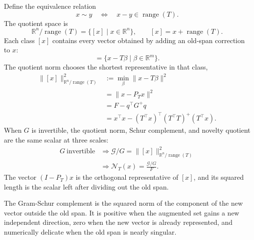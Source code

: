 \documentclass[10pt,twocolumn]{article}
\newcommand{\R}{\mathbb R}
\newcommand{\range}{\operatorname{range}}
\newcommand{\nov}{\mathcal N}
\begin{document}
Define the equivalence relation
\begin{equation}
x\sim y
\quad\Longleftrightarrow\quad
x-y\in\range(T).
\label{eq:quotient_relation}
\end{equation}
The quotient space is
\begin{equation}
\R^n/\range(T)
=\{[x]\mid x\in\R^n\},
\qquad
[x]=x+\range(T).
\label{eq:quotient_space}
\end{equation}
Each class \([x]\) contains every vector obtained by adding an old-span correction to \(x\):
\begin{equation}
[x]=\{x-T\beta\mid \beta\in\R^m\}.
\label{eq:quotient_class_ls}
\end{equation}
The quotient norm chooses the shortest representative in that class,
\begin{equation}
\begin{aligned}
\|[x]\|_{\R^n/\range(T)}^2
&:=\min_\beta \|x-T\beta\|^2\\
&=\|x-P_Tx\|^2\\
&=F-q^\top G^+q\\
&=x^\top x-(T^\top x)^\top(T^\top T)^+(T^\top x).
\end{aligned}
\label{eq:quotient_norm}
\end{equation}
When \(G\) is invertible, the quotient norm, Schur complement, and novelty quotient are the same scalar at three scales:
\begin{equation}
\begin{aligned}
G\ \text{invertible}
&\Longrightarrow
\mathcal G/G=\|[x]\|_{\R^n/\range(T)}^2\\
&\Longrightarrow
\nov_T(x)=\frac{\mathcal G/G}{F}.
\end{aligned}
\label{eq:quotient_schur_novelty_chain}
\end{equation}
The vector \((I-P_T)x\) is the orthogonal representative of \([x]\), and its squared length is the scalar left after dividing out the old span.

\begin{jargonbox}
The Gram-Schur complement is the squared norm of the component of the new vector outside the old span. It is positive when the augmented set gains a new independent direction, zero when the new vector is already represented, and numerically delicate when the old span is nearly singular.
\end{jargonbox}
\end{document}
